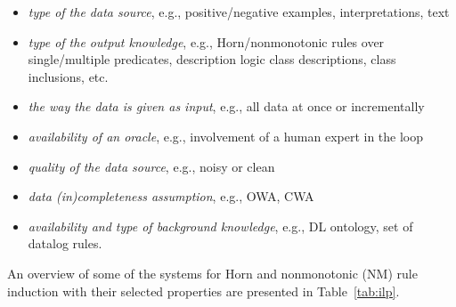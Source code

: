 \begin{itemize}
\item \emph{type of the data source}, e.g., positive/negative examples, interpretations, text
\item \emph{type of the output knowledge}, e.g., Horn/nonmonotonic rules over single/multiple predicates, description logic class descriptions, class inclusions, etc.
\item \emph{the way the data is given as input}, e.g., all data at once or incrementally
\item \emph{availability of an oracle}, e.g., involvement of a human expert in the loop
\item \emph{quality of the data source}, e.g., noisy or clean
\item \emph{data (in)completeness assumption}, e.g., OWA, CWA
\item \emph{availability and type of background knowledge}, e.g., DL ontology, set of datalog rules.

\end{itemize}

An overview of some of the systems for Horn and nonmonotonic (NM) rule induction with their selected properties are presented in Table~\ref{tab:ilp}. 

